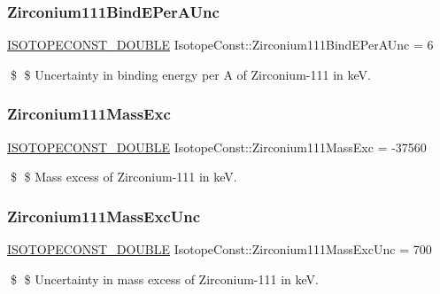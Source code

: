 \subsubsection{\texorpdfstring{Zirconium111\+Bind\+E\+Per\+A\+Unc}{Zirconium111BindEPerAUnc}}
{\footnotesize\ttfamily \mbox{\hyperlink{group___isotope_const-_macros_ga8f45a7272ce02c0b4c65c44636ed719a}{I\+S\+O\+T\+O\+P\+E\+C\+O\+N\+S\+T\+\_\+\+D\+O\+U\+B\+LE}} Isotope\+Const\+::\+Zirconium111\+Bind\+E\+Per\+A\+Unc = 6}

\$ \$ Uncertainty in binding energy per A of Zirconium-\/111 in keV. \mbox{\label{group___isotope_const-_zirconium-_zr111_gacfbc5eb7da3db9b2b33c4b37ebeb9e14}} 
\subsubsection{\texorpdfstring{Zirconium111\+Mass\+Exc}{Zirconium111MassExc}}
{\footnotesize\ttfamily \mbox{\hyperlink{group___isotope_const-_macros_ga8f45a7272ce02c0b4c65c44636ed719a}{I\+S\+O\+T\+O\+P\+E\+C\+O\+N\+S\+T\+\_\+\+D\+O\+U\+B\+LE}} Isotope\+Const\+::\+Zirconium111\+Mass\+Exc = -\/37560}

\$ \$ Mass excess of Zirconium-\/111 in keV. \mbox{\label{group___isotope_const-_zirconium-_zr111_ga3353e7b4d39f34a8bfd3da83f46c9b18}} 
\subsubsection{\texorpdfstring{Zirconium111\+Mass\+Exc\+Unc}{Zirconium111MassExcUnc}}
{\footnotesize\ttfamily \mbox{\hyperlink{group___isotope_const-_macros_ga8f45a7272ce02c0b4c65c44636ed719a}{I\+S\+O\+T\+O\+P\+E\+C\+O\+N\+S\+T\+\_\+\+D\+O\+U\+B\+LE}} Isotope\+Const\+::\+Zirconium111\+Mass\+Exc\+Unc = 700}

\$ \$ Uncertainty in mass excess of Zirconium-\/111 in keV. \mbox{\label{group___isotope_const-_zirconium-_zr111_ga433c32de525215a53f355a7df5bc33e4}} 
